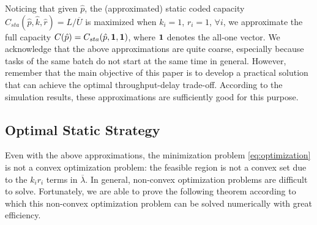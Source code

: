 \documentclass[journal]{IEEEtran}
\newcommand{\dimVec}{\hat{k}}
\newcommand{\compVec}{\hat{p}}
\newcommand{\rateVec}{\hat{r}}
\newcommand{\ones}{\bf{1}}
\newcommand{\CapSta}{C_{sta}}
\newcommand{\CapFull}{C}
\newcommand{\normArrival}{\overline{\lambda}}
\newcommand{\aveUsage}{\overline{U}}
\begin{document}
Noticing that given $\compVec$, the (approximated) static coded capacity $\CapSta(\compVec,\dimVec,\rateVec)=L/\aveUsage$ is maximized when $k_i=1$, $r_i=1$, $\forall i$, we approximate the full capacity $\CapFull(\compVec) = \CapSta(\compVec,\ones,\ones)$, where $\ones$ denotes the all-one vector. We acknowledge that the above approximations are quite coarse, especially because tasks of the same batch do not start at the same time in general.  However, remember that the main objective of this paper is to develop a practical solution that can achieve the optimal throughput-delay trade-off. According to the simulation results, these approximations are sufficiently good for this purpose.

\subsection{Optimal Static Strategy}
\label{ssec:ana:optStatic}


Even with the above approximations, the minimization problem \eqref{eq:optimization} is
not a convex optimization problem: the feasible region is not a convex set due to the $k_i r_i$ terms in $\normArrival$. In general, non-convex optimization problems are difficult to solve. Fortunately, we are able to prove the following theorem according to which this non-convex optimization problem can be solved numerically with great  efficiency.
\end{document}
